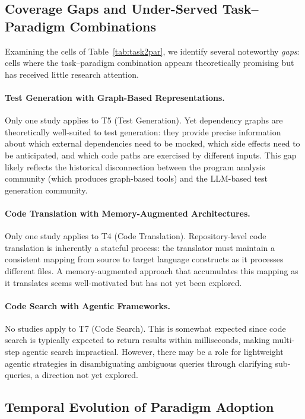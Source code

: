\subsection{Coverage Gaps and Under-Served Task--Paradigm Combinations}

Examining the cells of Table~\ref{tab:task2par}, we identify several noteworthy \emph{gaps}:
cells where the task--paradigm combination appears theoretically promising but has received
little research attention.

\paragraph{Test Generation with Graph-Based Representations.}
Only one study applies  to T5 (Test Generation). Yet dependency graphs are
theoretically well-suited to test generation: they provide precise information about which
external dependencies need to be mocked, which side effects need to be anticipated, and which
code paths are exercised by different inputs. This gap likely reflects the historical
disconnection between the program analysis community (which produces graph-based tools) and
the LLM-based test generation community.

\paragraph{Code Translation with Memory-Augmented Architectures.}
Only one study applies  to T4 (Code Translation). Repository-level code translation
is inherently a stateful process: the translator must maintain a consistent mapping from source
to target language constructs as it processes different files. A memory-augmented approach that
accumulates this mapping as it translates seems well-motivated but has not yet been explored.

\paragraph{Code Search with Agentic Frameworks.}
No studies apply  to T7 (Code Search). This is somewhat expected since code search
is typically expected to return results within milliseconds, making multi-step agentic search
impractical. However, there may be a role for lightweight agentic strategies in disambiguating
ambiguous queries through clarifying sub-queries, a direction not yet explored.

\subsection{Temporal Evolution of Paradigm Adoption}

